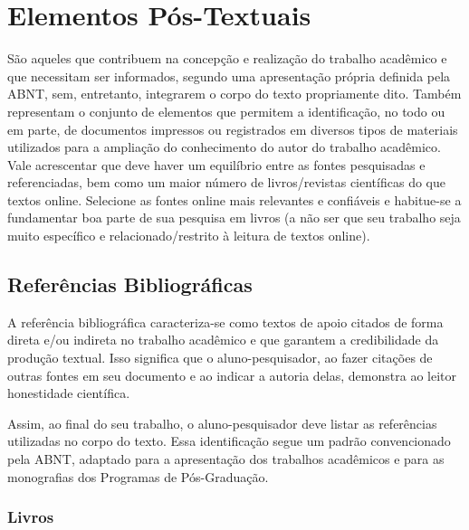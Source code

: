 \documentclass[
	12pt,				%
	openright,			%
	oneside,			%
	a4paper,			%
	english,			%
	french,				%
	spanish,			%
	brazil				%
	]{abntex2}
\begin{document}

\chapter{Elementos Pós-Textuais} \label{ch:posTextuais}

\par São aqueles que contribuem na concepção e realização do trabalho acadêmico e que necessitam ser informados, segundo uma apresentação própria definida pela ABNT, sem, entretanto, integrarem o corpo do texto propriamente dito. Também representam o conjunto de elementos que permitem a identificação, no todo ou em parte, de documentos impressos ou registrados em diversos tipos de materiais utilizados para a ampliação do conhecimento do autor do trabalho acadêmico. Vale acrescentar que deve haver um equilíbrio entre as fontes pesquisadas e referenciadas, bem como um maior número de livros/revistas científicas do que textos online. Selecione as fontes online mais relevantes e confiáveis e habitue-se a fundamentar boa parte de sua pesquisa em livros (a não ser que seu trabalho seja muito específico e relacionado/restrito à leitura de textos online).


\section{Referências Bibliográficas}

\par A referência bibliográfica caracteriza-se como textos de apoio citados de forma direta e/ou indireta no trabalho acadêmico e que garantem a credibilidade da produção textual. Isso significa que o aluno-pesquisador, ao fazer citações de outras fontes em seu documento e ao indicar a autoria delas, demonstra ao leitor honestidade científica. 

\par Assim, ao final do seu trabalho, o aluno-pesquisador deve listar as referências utilizadas no corpo do texto. Essa identificação segue um padrão convencionado pela ABNT, adaptado para a apresentação dos trabalhos acadêmicos e para as monografias dos Programas de Pós-Graduação.

\subsection{Livros}
\end{document}
